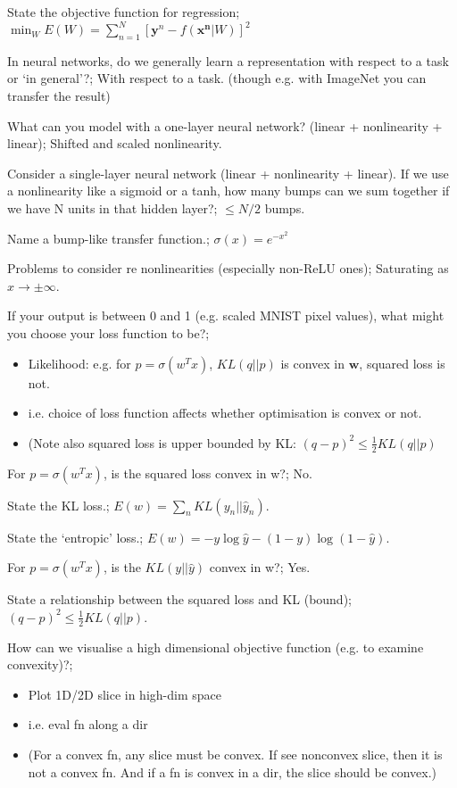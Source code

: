 \documentclass{article}
\begin{document}
State the objective function for regression; $\min_W E(W) = \sum_{n=1}^N [\mathbf{y}^n - f(\mathbf{x^n}|W)]^2$

In neural networks, do we generally learn a representation with respect to a task or `in general'?; With respect to a task. (though e.g. with ImageNet you can transfer the result)

What can you model with a one-layer neural network? (linear + nonlinearity + linear); Shifted and scaled nonlinearity.

Consider a single-layer neural network (linear + nonlinearity + linear).  If we use a nonlinearity like a sigmoid or a tanh, how many bumps can we sum together if we have N units in that hidden layer?; $\leq N/2$ bumps.

Name a bump-like transfer function.; $\sigma(x) = e^{-x^2}$

Problems to consider re nonlinearities (especially non-ReLU ones); Saturating as $x\rightarrow \pm\infty$.

If your output is between 0 and 1 (e.g. scaled MNIST pixel values), what might you choose your loss function to be?; \begin{itemize} \item Likelihood: e.g. for $p=\sigma(w^Tx)$, $KL(q||p)$ is convex in $\mathbf{w}$, squared loss is not. \item i.e. choice of loss function affects whether optimisation is convex or not. \item (Note also squared loss is upper bounded by KL: $(q-p)^2 \leq \frac{1}{2}KL(q||p)$ \end{itemize}

For $p=\sigma(w^Tx)$, is the squared loss convex in w?; No.

State the KL loss.; $E(w) = \sum_n KL(y_n||\hat{y}_n)$.

State the `entropic' loss.; $E(w) = -y\log\hat{y} - (1-y)\log(1-\hat{y})$.

For $p=\sigma(w^Tx)$, is the $KL(y||\hat{y})$ convex in w?; Yes.

State a relationship between the squared loss and KL (bound); $(q-p)^2 \leq \frac{1}{2}KL(q||p)$.

How can we visualise a high dimensional objective function (e.g. to examine convexity)?; \begin{itemize} \item Plot 1D/2D slice in high-dim space \item i.e. eval fn along a dir \item (For a convex fn, any slice must be convex. If see nonconvex slice, then it is not a convex fn. And if a fn is convex in a dir, the slice should be convex.) \end{itemize}
\end{document}
